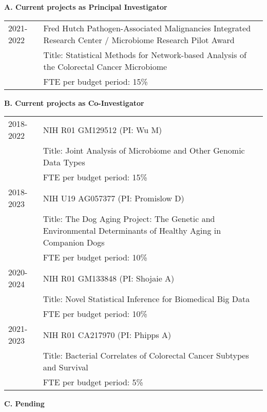 \documentclass[10pt]{article}
\begin{document}
\textbf{A. Current projects as Principal Investigator}
\begin{table}[H]
\hskip0.9cm\begin{tabular}{p{1.6cm}p{12cm}}
2021-2022 & Fred Hutch Pathogen-Associated Malignancies Integrated Research Center / Microbiome Research Pilot Award  \\
& Title: Statistical Methods for Network-based Analysis of the Colorectal Cancer Microbiome \\
& FTE per budget period: 15\%
\end{tabular}
\end{table}


\textbf{B. Current projects as Co-Investigator}

\begin{table}[H]
\hskip0.9cm\begin{tabular}{p{1.6cm}p{12cm}}
2018-2022 & NIH R01 GM129512 (PI: Wu M)  \\
& Title: Joint Analysis of Microbiome and Other Genomic Data Types\\
& FTE per budget period: 15\%\\
2018-2023 & NIH U19 AG057377 (PI: Promislow D) \\
& Title: The Dog Aging Project: The Genetic and Environmental Determinants of Healthy Aging in Companion Dogs\\
& FTE per budget period: 10\%\\
2020-2024 & NIH R01 GM133848 (PI: Shojaie A) \\
& Title: Novel Statistical Inference for Biomedical Big Data\\
& FTE per budget period: 10\%\\
2021-2023 &  NIH R01 CA217970 (PI: Phipps A)\\
&Title: Bacterial Correlates of Colorectal Cancer Subtypes and Survival\\
& FTE per budget period: 5\%\\
\end{tabular}
\end{table}


\textbf{C. Pending}
\end{document}
